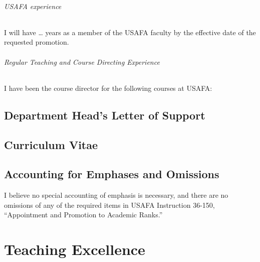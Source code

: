 \documentclass[11pt]{report}
\begin{document}
\paragraph{USAFA experience}
I will have \dots{} years as a member of the USAFA faculty by the effective date of the requested promotion.

\paragraph{Regular Teaching and Course Directing Experience}
I have been the course director for the following courses at USAFA:

\chapter{Department Head's Letter of Support}  %

%

\chapter{Curriculum Vitae}\label{section:cv}  %

%

\chapter{Accounting for Emphases and Omissions}  %

I believe no special accounting of emphasis is necessary, and there are no omissions of any of the required items in USAFA Instruction 36-150, ``Appointment and Promotion to Academic Ranks.''


\part{Teaching Excellence}\label{part:teaching excellence}

\end{document}
